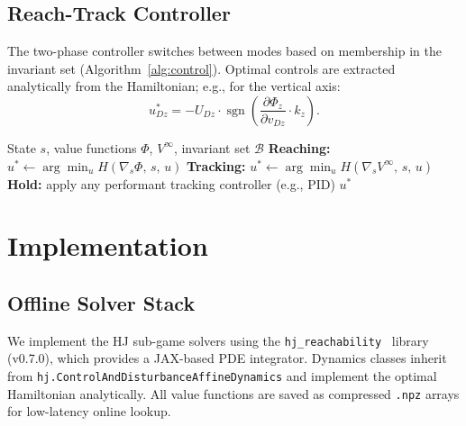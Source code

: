 \documentclass[conference]{IEEEtran}
\begin{document}
\subsection{Reach-Track Controller}

The two-phase controller switches between modes based on membership in the invariant set (Algorithm~\ref{alg:control}). Optimal controls are extracted analytically from the Hamiltonian; e.g., for the vertical axis:
\begin{equation}
  u_{Dz}^* = -U_{Dz} \cdot \operatorname{sgn}\!\left(\frac{\partial \Phi_z}{\partial v_{Dz}} \cdot k_z\right).
\end{equation}

\begin{algorithm}[h]
\caption{Reach-Track Control (per axis, from \cite{bui2025reach})}
\label{alg:control}
\begin{algorithmic}[1]
\REQUIRE State $s$, value functions $\Phi$, $V^\infty$, invariant set $\mathcal{B}$
  \STATE \textbf{Reaching:} $u^* \leftarrow \arg\min_u H(\nabla_s \Phi,\, s,\, u)$
  \STATE \textbf{Tracking:} $u^* \leftarrow \arg\min_u H(\nabla_s V^\infty,\, s,\, u)$
\ELSE
  \STATE \textbf{Hold:} apply any performant tracking controller (e.g., PID)
\ENDIF
\RETURN $u^*$
\end{algorithmic}
\end{algorithm}

\section{Implementation}
\label{sec:implementation}

\subsection{Offline Solver Stack}

We implement the HJ sub-game solvers using the \texttt{hj\_reachability}~\cite{hjreach} library (v0.7.0), which provides a JAX-based PDE integrator. Dynamics classes inherit from \texttt{hj.ControlAndDisturbanceAffineDynamics} and implement the optimal Hamiltonian analytically. All value functions are saved as compressed \texttt{.npz} arrays for low-latency online lookup.
\end{document}
